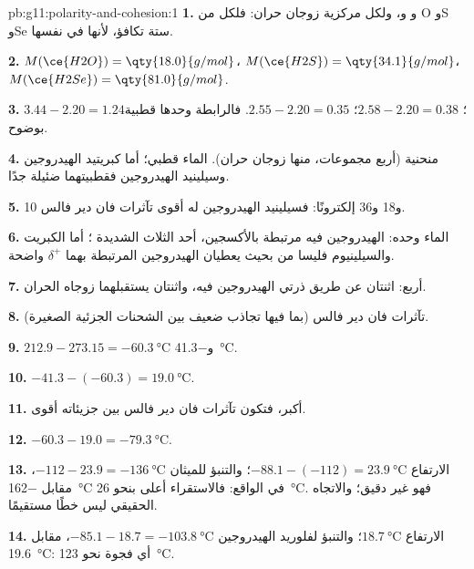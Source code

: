 \begin{solution}{pb:g11:polarity-and-cohesion:1}
\textbf{1.}  و و، ولكل  مركزية
زوجان حران: فلكل من O وS وSe ستة  تكافؤ، لأنها في
 نفسها.

\textbf{2.} $M(\ce{H2O}) = \qty{18.0}{g/mol}$، $M(\ce{H2S}) =
\qty{34.1}{g/mol}$، $M(\ce{H2Se}) = \qty{81.0}{g/mol}$.

\textbf{3.} $3.44 - 2.20 = 1.24$؛ $2.58 - 2.20 = 0.38$؛
$2.55 - 2.20 = 0.35$. فالرابطة  وحدها قطبية بوضوح.

\textbf{4.} منحنية (أربع مجموعات، منها زوجان حران). الماء قطبي؛ أما كبريتيد
الهيدروجين وسيلينيد الهيدروجين فقطبيتهما ضئيلة جدًا.

\textbf{5.} 10 و18 و36 إلكترونًا: فسيلينيد الهيدروجين له أقوى
تآثرات فان دير فالس.

\textbf{6.} الماء وحده:  الهيدروجين فيه مرتبطة بالأكسجين، أحد
 الثلاث الشديدة ؛ أما الكبريت والسيلينيوم فليسا من 
بحيث يعطيان  الهيدروجين المرتبطة بهما $\delta^+$
واضحة.

\textbf{7.} أربع: اثنتان عن طريق ذرتي الهيدروجين فيه، واثنتان يستقبلهما
زوجاه الحران.

\textbf{8.} تآثرات فان دير فالس (بما فيها تجاذب ضعيف
بين الشحنات الجزئية الصغيرة).

\textbf{9.} $212.9 - 273.15 = \qty{-60.3}{\celsius}$
و\qty{-41.3}{\celsius}.

\textbf{10.} $-41.3 - (-60.3) = \qty{19.0}{\celsius}$.

\textbf{11.}  أكبر، فتكون تآثرات فان دير فالس بين جزيئاته
أقوى.

\textbf{12.} $-60.3 - 19.0 = \qty{-79.3}{\celsius}$.

\textbf{13.} الارتفاع $-88.1 - (-112) = \qty{23.9}{\celsius}$؛ والتنبؤ
للميثان $-112 - 23.9 = \qty{-136}{\celsius}$، مقابل \qty{-162}{\celsius}
في الواقع: فالاستقراء أعلى بنحو \qty{26}{\celsius}. فهو غير
دقيق؛ والاتجاه الحقيقي ليس خطًا مستقيمًا.

\textbf{14.} الارتفاع $\qty{18.7}{\celsius}$؛ والتنبؤ لفلوريد الهيدروجين
$-85.1 - 18.7 = \qty{-103.8}{\celsius}$، مقابل \qty{19.6}{\celsius}: أي
فجوة نحو \qty{123}{\celsius}.


\end{solution}
